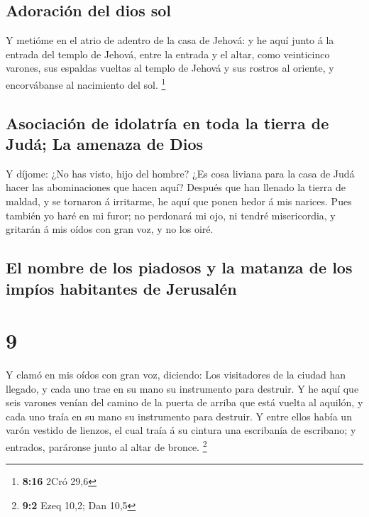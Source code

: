 \hypertarget{adoraciuxf3n-del-dios-sol}{%
\subsection{Adoración del dios sol}\label{adoraciuxf3n-del-dios-sol}}

 Y metióme en el atrio de adentro de la casa de Jehová: y
he aquí junto á la entrada del templo de Jehová, entre la entrada y el
altar, como veinticinco varones, sus espaldas vueltas al templo de
Jehová y sus rostros al oriente, y encorvábanse al nacimiento del sol.
\footnote{\textbf{8:16} 2Cró 29,6}

\hypertarget{asociaciuxf3n-de-idolatruxeda-en-toda-la-tierra-de-juduxe1-la-amenaza-de-dios}{%
\subsection{Asociación de idolatría en toda la tierra de Judá; La
amenaza de
Dios}\label{asociaciuxf3n-de-idolatruxeda-en-toda-la-tierra-de-juduxe1-la-amenaza-de-dios}}

 Y díjome: ¿No has visto, hijo del hombre? ¿Es cosa
liviana para la casa de Judá hacer las abominaciones que hacen aquí?
Después que han llenado la tierra de maldad, y se tornaron á irritarme,
he aquí que ponen hedor á mis narices.  Pues también yo
haré en mi furor; no perdonará mi ojo, ni tendré misericordia, y
gritarán á mis oídos con gran voz, y no los oiré.

\hypertarget{el-nombre-de-los-piadosos-y-la-matanza-de-los-impuxedos-habitantes-de-jerusaluxe9n}{%
\subsection{El nombre de los piadosos y la matanza de los impíos
habitantes de
Jerusalén}\label{el-nombre-de-los-piadosos-y-la-matanza-de-los-impuxedos-habitantes-de-jerusaluxe9n}}

\hypertarget{section-8}{%
\section{9}\label{section-8}}

 Y clamó en mis oídos con gran voz, diciendo: Los
visitadores de la ciudad han llegado, y cada uno trae en su mano su
instrumento para destruir.  Y he aquí que seis varones
venían del camino de la puerta de arriba que está vuelta al aquilón, y
cada uno traía en su mano su instrumento para destruir. Y entre ellos
había un varón vestido de lienzos, el cual traía á su cintura una
escribanía de escribano; y entrados, paráronse junto al altar de bronce.
\footnote{\textbf{9:2} Ezeq 10,2; Dan 10,5}

